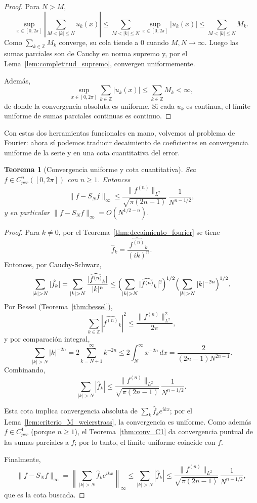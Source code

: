 \documentclass[a4paper,11pt]{report}
\newtheorem{theorem}{Teorema}[chapter]
\begin{document}
\begin{proof}
Para $N>M$,
\[
\sup_{x\in[0,2\pi]}\left|\sum_{M<|k|\le N}u_k(x)\right|
\le \sum_{M<|k|\le N}\sup_{x\in[0,2\pi]}|u_k(x)|
\le \sum_{M<|k|\le N}M_k.
\]
Como $\sum_{k\in\mathbb Z}M_k$ converge, su cola tiende a $0$ cuando $M,N\to\infty$. Luego las sumas parciales son de Cauchy en norma supremo y, por el Lema~\ref{lem:completitud_supremo}, convergen uniformemente.

Además,
\[
\sup_{x\in[0,2\pi]}\sum_{k\in\mathbb Z}|u_k(x)|
\le \sum_{k\in\mathbb Z}M_k<\infty,
\]
de donde la convergencia absoluta es uniforme. Si cada $u_k$ es continua, el límite uniforme de sumas parciales continuas es continuo.
\end{proof}

Con estas dos herramientas funcionales en mano, volvemos al problema de Fourier: ahora s\'i podemos traducir decaimiento de coeficientes en convergencia uniforme de la serie y en una cota cuantitativa del error.

\begin{theorem}[Convergencia uniforme y cota cuantitativa]\label{thm:convergencia_uniforme_fourier}
Sea $f\in C^n_{per}([0,2\pi])$ con $n\ge 1$. Entonces
\[
\|f-S_Nf\|_\infty \le \frac{\|f^{(n)}\|_{L^2}}{\sqrt{\pi(2n-1)}}\,\frac{1}{N^{n-1/2}},
\]
y en particular $\|f-S_Nf\|_\infty=O(N^{1/2-n})$.
\end{theorem}

\begin{proof}
Para $k\neq 0$, por el Teorema~\ref{thm:decaimiento_fourier} se tiene
\[
\hat f_k=\frac{\widehat{f^{(n)}}_k}{(ik)^n}.
\]
Entonces, por Cauchy-Schwarz,
\[
\sum_{|k|>N}|\hat f_k|
=\sum_{|k|>N}\frac{|\widehat{f^{(n)}}_k|}{|k|^n}
\le
\Bigl(\sum_{|k|>N}|\widehat{f^{(n)}}_k|^2\Bigr)^{1/2}
\Bigl(\sum_{|k|>N}|k|^{-2n}\Bigr)^{1/2}.
\]
Por Bessel (Teorema~\ref{thm:bessel}),
\[
\sum_{k\in\mathbb Z}|\widehat{f^{(n)}}_k|^2\le \frac{\|f^{(n)}\|_{L^2}^2}{2\pi},
\]
y por comparación integral,
\[
\sum_{|k|>N}|k|^{-2n}=2\sum_{k=N+1}^{\infty}k^{-2n}
\le 2\int_N^{\infty}x^{-2n}\,dx
=\frac{2}{(2n-1)N^{2n-1}}.
\]
Combinando,
\[
\sum_{|k|>N}|\hat f_k|
\le \frac{\|f^{(n)}\|_{L^2}}{\sqrt{\pi(2n-1)}}\,\frac{1}{N^{n-1/2}}.
\]

Esta cota implica convergencia absoluta de $\sum_k \hat f_k e^{ikx}$; por el Lema~\ref{lem:criterio_M_weierstrass}, la convergencia es uniforme. Como además $f\in C^1_{per}$ (porque $n\ge 1$), el Teorema~\ref{thm:conv_C1} da convergencia puntual de las sumas parciales a $f$; por lo tanto, el límite uniforme coincide con $f$.

Finalmente,
\[
\|f-S_Nf\|_\infty
=\left\|\sum_{|k|>N}\hat f_k e^{ikx}\right\|_\infty
\le \sum_{|k|>N}|\hat f_k|
\le \frac{\|f^{(n)}\|_{L^2}}{\sqrt{\pi(2n-1)}}\,\frac{1}{N^{n-1/2}},
\]
que es la cota buscada.
\end{proof}
\end{document}

